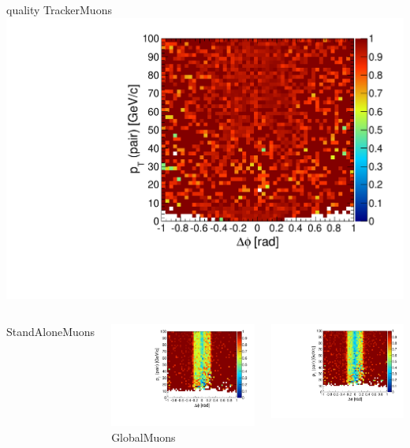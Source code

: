 \documentclass[compress]{beamer}
\begin{document}
\begin{frame}
\begin{columns}
\centering quality TrackerMuons
\includegraphics[width=\linewidth]{barrel_dphipt_dzoverr03cut_TrackerMuon.pdf}
\end{columns}
\begin{columns}
\centering StandAloneMuons

\includegraphics[width=\linewidth]{endcap_dphipt_droverz01cut_StandAloneMuon.pdf}
\centering GlobalMuons

\includegraphics[width=\linewidth]{endcap_dphipt_droverz01cut_GlobalMuon.pdf}


\end{columns}
\end{frame}
\end{document}
